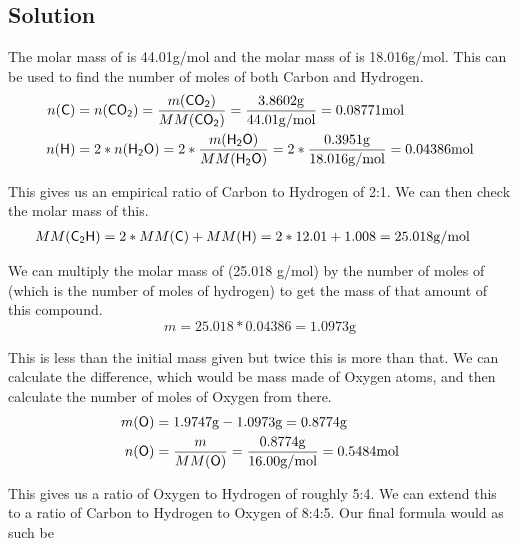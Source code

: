 \documentclass[10pt]{article}
\begin{document}
        \subsection{Solution}
            The molar mass of  is 44.01\unit{\gram/\mole} and the molar mass of  is 18.016\unit{\gram/\mole}.
            This can be used to find the number of moles of both Carbon and Hydrogen.
            \begin{align}
                n(\ce{C})   &=  n(\ce{CO2})
                    =   \frac{m(\ce{CO2})}{MM(\ce{CO2})}
                    =   \frac{3.8602 \unit{\gram}}{44.01 \unit{\gram/\mole}}
                    =   0.08771 \unit{\mole}\\
                n(\ce{H})   &=  2 * n(\ce{H2O})
                    =   2 * \frac{m(\ce{H2O})}{MM(\ce{H2O})}
                    =   2 * \frac{0.3951 \unit{\gram}}{18.016 \unit{\gram/\mole}}
                    =   0.04386 \unit{\mole}
            \end{align}

            This gives us an empirical ratio of Carbon to Hydrogen of 2:1.
            We can then check the molar mass of this.
            \begin{align}
                MM(\ce{C2H})    &=  2 * MM(\ce{C}) + MM(\ce{H})
                    =   2 * 12.01 + 1.008
                    =   25.018 \unit{\gram/\mole}
            \end{align}

            We can multiply the molar mass of  (25.018 \unit{\gram/\mole}) by the number of moles of  (which is the number of moles of hydrogen) to get the mass of that amount of this compound.
            \begin{equation}
                m   =   25.018 * 0.04386    =   1.0973 \unit{\gram}
            \end{equation}

            This is less than the initial mass given but twice this is more than that.
            We can calculate the difference, which would be mass made of Oxygen atoms, and then calculate the number of moles of Oxygen from there.
            \begin{align}
                m(\ce{O})   &=  1.9747 \unit{\gram} - 1.0973 \unit{\gram}
                    =   0.8774 \unit{\gram}\\
                n(\ce{O})   &=  \frac{m}{MM(\ce{O})}
                    =   \frac{0.8774\unit{\gram}}{16.00\unit{\gram/\mole}}
                    =   0.5484 \unit{\mole}
            \end{align}

            This gives us a ratio of Oxygen to Hydrogen of roughly 5:4.
            We can extend this to a ratio of Carbon to Hydrogen to Oxygen of 8:4:5.
            Our final formula would as such be 
\end{document}
